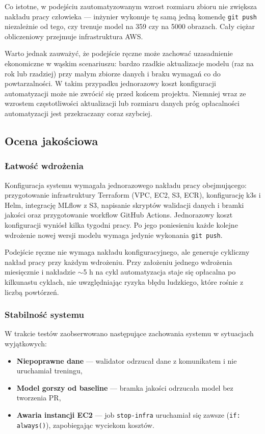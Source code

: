 Co istotne, w podejściu zautomatyzowanym wzrost rozmiaru zbioru nie zwiększa nakładu pracy człowieka --- inżynier wykonuje tę samą jedną komendę \texttt{git push} niezależnie od tego, czy trenuje model na 359 czy na 5000 obrazach. Cały ciężar obliczeniowy przejmuje infrastruktura AWS.

Warto jednak zauważyć, że podejście ręczne może zachować uzasadnienie ekonomiczne w wąskim scenariuszu: bardzo rzadkie aktualizacje modelu (raz na rok lub rzadziej) przy małym zbiorze danych i braku wymagań co do powtarzalności. W takim przypadku jednorazowy koszt konfiguracji automatyzacji może nie zwrócić się przed końcem projektu. Niemniej wraz ze wzrostem częstotliwości aktualizacji lub rozmiaru danych próg opłacalności automatyzacji jest przekraczany coraz szybciej.

\subsection{Ocena jakościowa}

\subsubsection{Łatwość wdrożenia}

Konfiguracja systemu wymagała jednorazowego nakładu pracy obejmującego: przygotowanie infrastruktury Terraform (VPC, EC2, S3, ECR), konfigurację k3s i Helm, integrację MLflow z S3, napisanie skryptów walidacji danych i bramki jakości oraz przygotowanie workflow GitHub Actions. Jednorazowy koszt konfiguracji wyniósł kilka tygodni pracy. Po jego poniesieniu każde kolejne wdrożenie nowej wersji modelu wymaga jedynie wykonania \texttt{git push}.

Podejście ręczne nie wymaga nakładu konfiguracyjnego, ale generuje cykliczny nakład pracy przy każdym wdrożeniu. Przy założeniu jednego wdrożenia miesięcznie i nakładzie $\sim$5 h na cykl automatyzacja staje się opłacalna po kilkunastu cyklach, nie uwzględniając ryzyka błędu ludzkiego, które rośnie z liczbą powtórzeń.

\subsubsection{Stabilność systemu}

W trakcie testów zaobserwowano następujące zachowania systemu w sytuacjach wyjątkowych:
\begin{itemize}
  \item \textbf{Niepoprawne dane} --- walidator odrzucał dane z komunikatem i nie uruchamiał treningu,
  \item \textbf{Model gorszy od baseline} --- bramka jakości odrzucała model bez tworzenia PR,
  \item \textbf{Awaria instancji EC2} --- job \texttt{stop-infra} uruchamiał się zawsze (\texttt{if: always()}), zapobiegając wyciekom kosztów.
\end{itemize}

